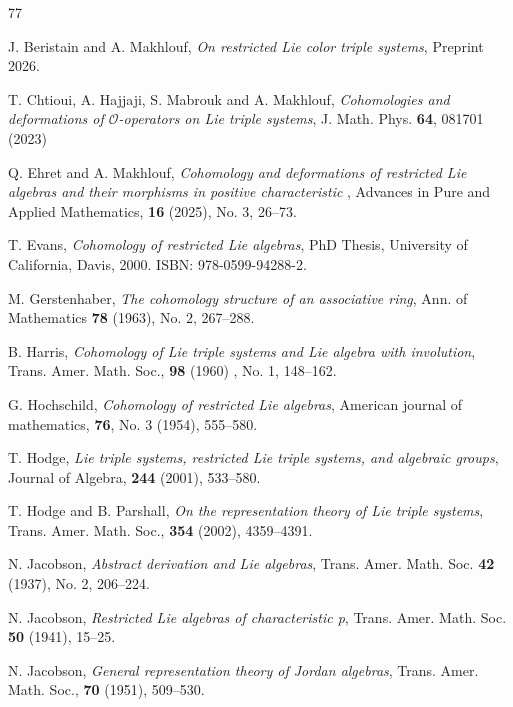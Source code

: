 \documentclass[11pt, twoside]{article}
\begin{document}
\begin{thebibliography}{77}
         
        J. Beristain and A. Makhlouf,
        \emph{On restricted Lie color triple systems}, Preprint 2026.

        T. Chtioui, A. Hajjaji, S. Mabrouk and A. Makhlouf,
        \emph{Cohomologies and deformations of $\mathcal{O}$-operators on Lie triple systems}, J. Math. Phys. \textbf{64}, 081701 (2023)

      Q. Ehret and A. Makhlouf,
        \emph{Cohomology and deformations of restricted Lie algebras and their morphisms in positive characteristic }, Advances in Pure and Applied Mathematics, {\bf 16} (2025), No. 3, 26--73.
        
        T. Evans,
        \emph{Cohomology of restricted Lie algebras}, PhD Thesis, University of California, Davis,
        2000. ISBN: 978-0599-94288-2.	

        M. Gerstenhaber,
        \emph{The cohomology structure of an associative ring}, Ann. of Mathematics {\bf 78} (1963), No. $2$, 267--288.

        B. Harris,
        \emph{Cohomology of Lie triple systems and Lie algebra with involution}, Trans. Amer. Math. Soc., {\bf 98} (1960) , No. 1, 148--162.

        G. Hochschild,
        \emph{Cohomology of restricted Lie algebras}, American journal of mathematics, {\bf 76}, No. $3$ (1954), 555--580.

        T. Hodge,
        \emph{Lie triple systems, restricted Lie triple systems, and algebraic groups}, Journal of Algebra, {\bf 244} (2001), 533--580.

        T. Hodge and B. Parshall,
        \emph{On the representation theory of Lie triple systems}, Trans. Amer. Math. Soc., {\bf 354} (2002), 4359--4391.

        N. Jacobson,
        \emph{Abstract derivation and Lie algebras},
        Trans. Amer. Math. Soc. {\bf 42} (1937), No. 2, 206--224.

        N. Jacobson,
        \emph{Restricted Lie algebras of characteristic p},
        Trans. Amer. Math. Soc. {\bf 50} (1941), 15--25.

        N. Jacobson,
        \emph{General representation theory of Jordan algebras}, Trans. Amer. Math. Soc., {\bf 70} (1951), 509--530.


\end{thebibliography}
\end{document}
